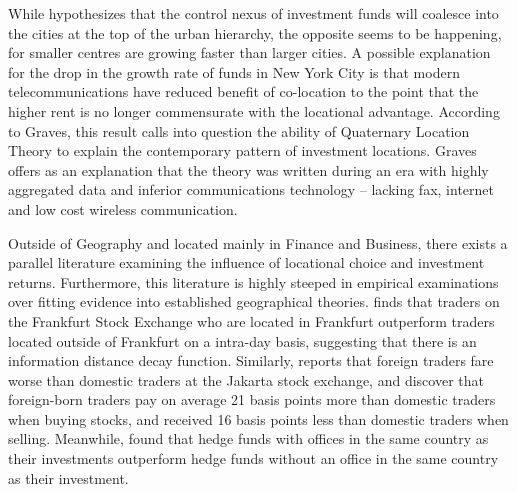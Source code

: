 While \cite{gravesthe1998} hypothesizes that the control nexus of investment funds will coalesce into the cities at the top of the urban hierarchy, the opposite seems to be happening, for smaller centres are growing faster than larger cities.  A possible explanation for the drop in the growth rate of funds in New York City is that modern telecommunications have reduced benefit of co-location to the point that the higher rent is no longer commensurate with the locational advantage. According to Graves, this result calls into question the ability of Quaternary Location Theory to explain the contemporary pattern of investment locations. Graves offers as an explanation that the theory was written during an era with highly aggregated data and inferior communications technology -- lacking fax, internet and low cost wireless communication.     
	
Outside of Geography and located mainly in Finance and Business, there exists a parallel literature examining the influence of locational choice and investment returns. Furthermore, this literature is highly steeped in empirical examinations over fitting evidence into established geographical theories. \cite{Hau2001} finds that traders on the Frankfurt Stock Exchange who are located in Frankfurt outperform traders located outside of Frankfurt on a intra-day basis, suggesting that there is an information distance decay function.  Similarly, \cite{Dovak2005} reports that foreign traders fare worse than domestic traders at the Jakarta stock exchange, and	\cite{choedo2004} discover that foreign-born traders pay on average 21 basis points more than domestic traders when buying stocks, and received 16 basis points less than domestic traders when selling. Meanwhile, \cite{teothe2009} found that hedge funds with offices in the same country as their investments outperform hedge funds without an office in the same country as their investment. 
	
